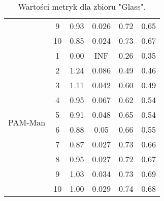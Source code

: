 \begin{table}[H]
\begin{tabular}{cc|cccc}
  & 9 & 0.93 & 0.026 & 0.72 & 0.65 \\ 
  & 10 & 0.85 & 0.024 & 0.73 & 0.67 \\ \hline \hline
  \multirow{10}{*}{PAM-Man} & 1 & 0.00 & INF & 0.26 & 0.35 \\ 
  & 2 & 1.24 & 0.086 & 0.49 & 0.46 \\ 
  & 3 & 1.11 & 0.042 & 0.60 & 0.49 \\ 
  & 4 & 0.95 & 0.067 & 0.62 & 0.54 \\ 
  & 5 & 0.91 & 0.048 & 0.65 & 0.54 \\ 
  & 6 & 0.88 & 0.05 & 0.66 & 0.55 \\ 
  & 7 & 0.87 & 0.027 & 0.73 & 0.66 \\ 
  & 8 & 0.95 & 0.027 & 0.72 & 0.67 \\ 
  & 9 & 1.03 & 0.034 & 0.73 & 0.69 \\ 
  & 10 & 1.00 & 0.029 & 0.74 & 0.68 \\ 
   \hline
\end{tabular}
  \caption{Wartości metryk dla zbioru "Glass".}
\end{table}
